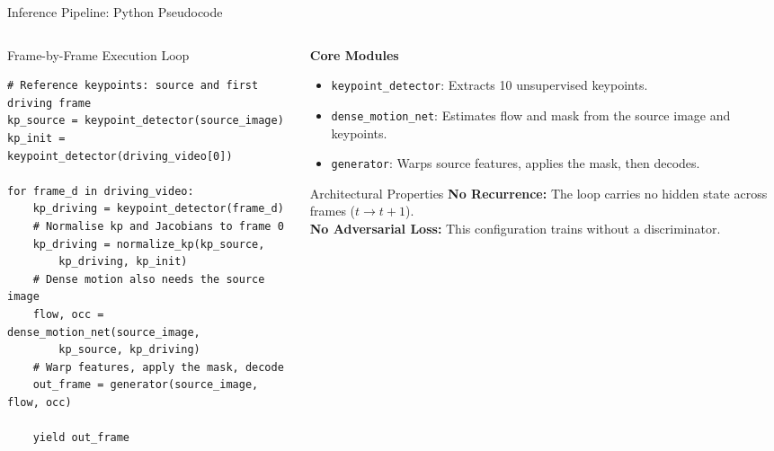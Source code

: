 \begin{frame}[fragile]{Inference Pipeline: Python Pseudocode}
    \begin{columns}[T]
        \begin{column}{0.56\textwidth}
            \begin{block}{Frame-by-Frame Execution Loop}
                \scriptsize
\begin{verbatim}
# Reference keypoints: source and first driving frame
kp_source = keypoint_detector(source_image)
kp_init = keypoint_detector(driving_video[0])

for frame_d in driving_video:
    kp_driving = keypoint_detector(frame_d)
    # Normalise kp and Jacobians to frame 0
    kp_driving = normalize_kp(kp_source,
        kp_driving, kp_init)
    # Dense motion also needs the source image
    flow, occ = dense_motion_net(source_image,
        kp_source, kp_driving)
    # Warp features, apply the mask, decode
    out_frame = generator(source_image, flow, occ)

    yield out_frame
\end{verbatim}
            \end{block}
        \end{column}

        \begin{column}{0.41\textwidth}
            \small \textbf{Core Modules}
            \begin{itemize}
                \footnotesize
                \item \texttt{keypoint\_detector}: Extracts 10 unsupervised keypoints.
                \item \texttt{dense\_motion\_net}: Estimates flow and mask from the source image and keypoints.
                \item \texttt{generator}: Warps source features, applies the mask, then decodes.
            \end{itemize}

            \vspace{0.1cm}
            \begin{block}{Architectural Properties}
                \scriptsize
                \textbf{No Recurrence:} The loop carries no hidden state across frames ($t \to t+1$).\\
                \textbf{No Adversarial Loss:} This configuration trains without a discriminator.
            \end{block}
        \end{column}
    \end{columns}
\end{frame}
